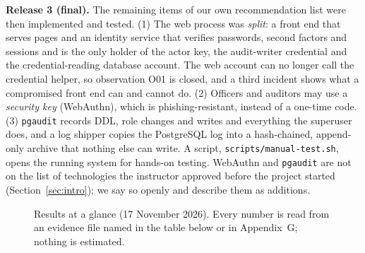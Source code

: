 \documentclass[10pt,a4paper]{article}
\newcommand{\code}[1]{\nolinkurl{#1}}
\newcommand{\diagram}[3]{\begin{figure}[!htbp]\centering\adjustbox{max width=\linewidth,max height=6.6cm}{}\caption{#2}\label{fig:#3}\end{figure}}
\begin{document}
\textbf{Release 3 (final).} The remaining items of our own recommendation list were then implemented and tested. (1) The web process was \emph{split}: a front end that serves pages and an identity service that verifies passwords, second factors and sessions and is the only holder of the actor key, the audit-writer credential and the credential-reading database account. The web account can no longer call the credential helper, so observation O01 is closed, and a third incident shows what a compromised front end can and cannot do. (2) Officers and auditors may use a \emph{security key} (WebAuthn), which is phishing-resistant, instead of a one-time code. (3) \code{pgaudit} records DDL, role changes and writes and everything the superuser does, and a log shipper copies the PostgreSQL log into a hash-chained, append-only archive that nothing else can write. A script, \code{scripts/manual-test.sh}, opens the running system for hands-on testing. WebAuthn and \code{pgaudit} are not on the list of technologies the instructor approved before the project started (Section~\ref{sec:intro}); we say so openly and describe them as additions.

\diagram{dashboard}{Results at a glance (17 November 2026). Every number is read from an evidence file named in the table below or in Appendix~G; nothing is estimated.}{dashboard}
\end{document}
